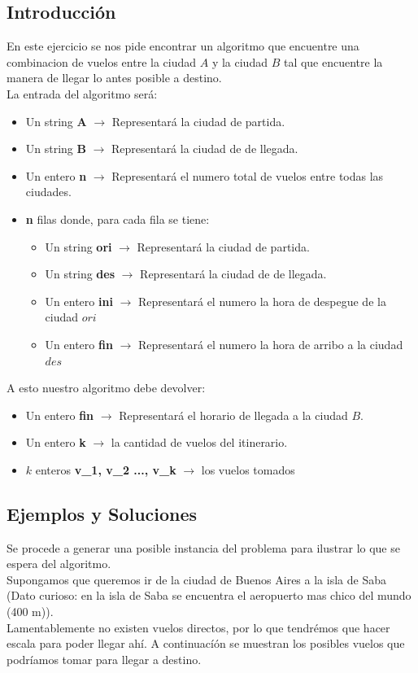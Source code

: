 \subsection{Introducci\'on} 

En este ejercicio se nos pide encontrar un algoritmo que encuentre una combinacion de vuelos entre la ciudad $A$ y la ciudad $B$ tal que encuentre la manera de llegar lo antes posible a destino.
\\
La entrada del algoritmo ser\'a:

\begin{itemize}
\item Un string \textbf{A} $\rightarrow$ Representar\'a la ciudad de partida.
\item Un string \textbf{B} $\rightarrow$ Representar\'a la ciudad de de llegada.
\item Un entero \textbf{n} $\rightarrow$ Representar\'a el numero total de vuelos entre todas las ciudades.
\item \textbf{n} filas donde, para cada fila se tiene:
\begin{itemize}
\item Un string \textbf{ori} $\rightarrow$ Representar\'a la ciudad de partida.
\item Un string \textbf{des} $\rightarrow$ Representar\'a la ciudad de de llegada.
\item Un entero \textbf{ini} $\rightarrow$ Representar\'a el numero la hora de despegue de la ciudad $ori$
\item Un entero \textbf{fin} $\rightarrow$ Representar\'a el numero la hora de arribo a la ciudad $des$
\end{itemize}
\end{itemize}

A esto nuestro algoritmo debe devolver:
\begin{itemize}
\item Un entero \textbf{fin} $\rightarrow$ Representar\'a el horario de llegada a la ciudad $B$.
\item Un entero \textbf{k} $\rightarrow$ la cantidad de vuelos del itinerario.
\item $k$ enteros \textbf{v_1, v_2 ..., v_k} $\rightarrow$ los vuelos tomados
\end{itemize}

\subsection{Ejemplos y Soluciones}
Se procede a generar una posible instancia del problema para ilustrar lo que se espera del algoritmo.
\\
Supongamos que queremos ir de la ciudad de Buenos Aires a la isla de Saba (Dato curioso: en la isla de Saba se encuentra el aeropuerto mas chico del mundo (400 m)).
\\
Lamentablemente no existen vuelos directos, por lo que tendrémos que hacer escala para poder llegar ahí. A continuacíón se muestran los posibles vuelos que podríamos tomar para llegar a destino.

